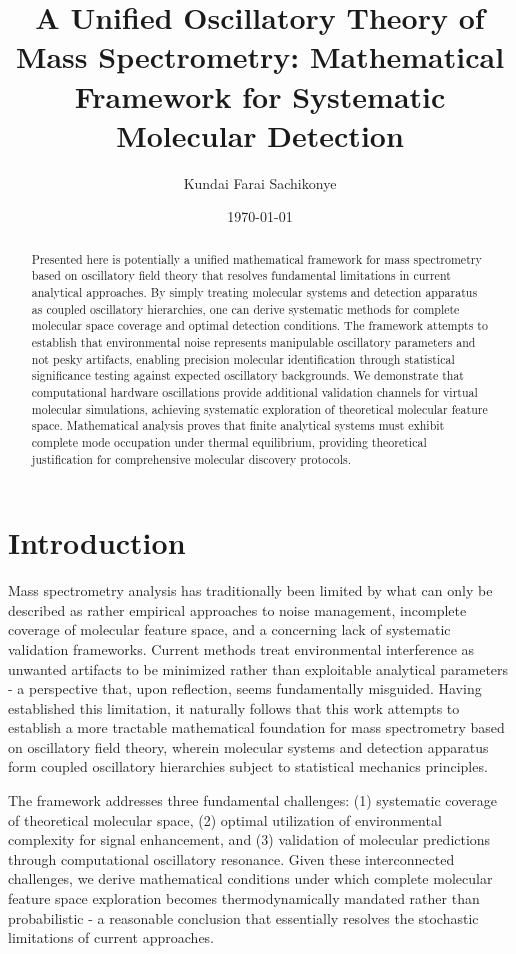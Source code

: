 \documentclass[11pt,a4paper]{article}
\title{A Unified Oscillatory Theory of Mass Spectrometry: Mathematical Framework for Systematic Molecular Detection}
\author{Kundai Farai Sachikonye}
\date{\today}
\begin{document}
\maketitle

\begin{abstract}
Presented here is potentially  a unified mathematical framework for mass spectrometry based on oscillatory field theory that resolves fundamental limitations in current analytical approaches. By simply  treating molecular systems and detection apparatus as coupled oscillatory hierarchies, one can  derive systematic methods for complete molecular space coverage and optimal detection conditions. The framework attempts to  establish that environmental noise represents manipulable oscillatory parameters and not pesky artifacts, enabling precision molecular identification through statistical significance testing against expected oscillatory backgrounds. We demonstrate that computational hardware oscillations provide additional validation channels for virtual molecular simulations, achieving systematic exploration of theoretical molecular feature space. Mathematical analysis proves that finite analytical systems must exhibit complete mode occupation under thermal equilibrium, providing theoretical justification for comprehensive molecular discovery protocols.
\end{abstract}

\section{Introduction}

Mass spectrometry analysis has traditionally been limited by what can only be described as rather empirical approaches to noise management, incomplete coverage of molecular feature space, and a concerning lack of systematic validation frameworks. Current methods treat environmental interference as unwanted artifacts to be minimized rather than exploitable analytical parameters - a perspective that, upon reflection, seems fundamentally misguided. Having established this limitation, it naturally follows that this work attempts to establish a more tractable mathematical foundation for mass spectrometry based on oscillatory field theory, wherein molecular systems and detection apparatus form coupled oscillatory hierarchies subject to statistical mechanics principles.

The framework addresses three fundamental challenges: (1) systematic coverage of theoretical molecular space, (2) optimal utilization of environmental complexity for signal enhancement, and (3) validation of molecular predictions through computational oscillatory resonance. Given these interconnected challenges, we derive mathematical conditions under which complete molecular feature space exploration becomes thermodynamically mandated rather than probabilistic - a reasonable conclusion that essentially resolves the stochastic limitations of current approaches.
\end{document}
